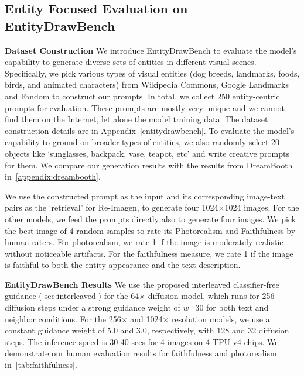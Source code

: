 \documentclass{article} \usepackage{iclr2023_conference,times}
\newcommand{\modelname}{{Re-Imagen}\xspace}
\begin{document}
\subsection{Entity Focused Evaluation on EntityDrawBench}
\noindent \textbf{Dataset Construction}
We introduce EntityDrawBench to evaluate the model's capability to generate diverse sets of entities in different visual scenes. Specifically, we pick various types of visual entities (dog breeds, landmarks, foods, birds, and animated characters) from Wikipedia Commons, Google Landmarks and Fandom to construct our prompts. In total, we collect 250 entity-centric prompts for evaluation. These prompts are mostly very unique and we cannot find them on the Internet, let alone the model training data. The dataset construction details are in Appendix~\ref{entitydrawbench}. To evaluate the model's capability to ground on broader types of entities, we also randomly select 20 objects like `sunglasses, backpack, vase, teapot, etc' and write creative prompts for them. We compare our generation results with the results from DreamBooth~\citep{ruiz2022dreambooth} in~\autoref{appendix:dreambooth}. 

We use the constructed prompt as the input and its corresponding image-text pairs as the `retrieval' for \modelname, to generate four 1024$\times$1024 images. For the other models, we feed the prompts directly also to generate four images. We pick the best image of 4 random samples to rate its Photorealism and Faithfulness by human raters. For photorealism, we rate 1 if the image is moderately realistic without noticeable artifacts. For the faithfulness measure, we rate 1 if the image is faithful to both the entity appearance and the text description.

\noindent \textbf{EntityDrawBench Results}
We use the proposed interleaved classifier-free guidance (\autoref{sec:interleaved}) for the 64$\times$ diffusion model, which runs for 256 diffusion steps under a strong guidance weight of $w$=30 for both text and neighbor conditions. For the 256$\times$ and 1024$\times$ resolution models, we use a constant guidance weight of 5.0 and 3.0, respectively, with 128 and 32 diffusion steps. The inference speed is 30-40 secs for 4 images on 4 TPU-v4 chips. We demonstrate our human evaluation results for faithfulness and photorealism in~\autoref{tab:faithfulness}.
\end{document}
